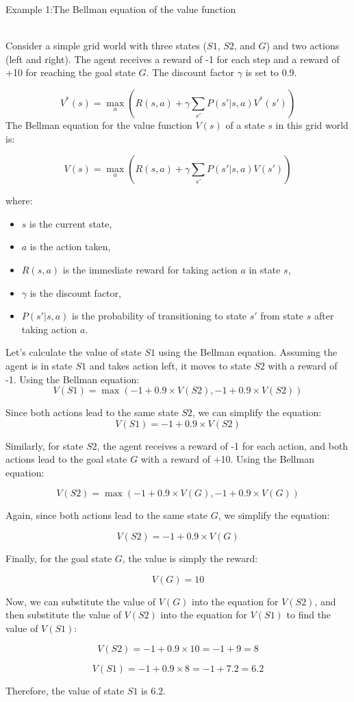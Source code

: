 \documentclass{article}
\begin{document}
\begin{Large}
Example 1:The Bellman equation of the value function
\end{Large}
\\
Consider a simple grid world with three states ($S1$, $S2$, and $G$) and two actions (left and right). The agent receives a reward of -1 for each step and a reward of +10 for reaching the goal state $G$. The discount factor $\gamma$ is set to 0.9.

\[
V^*(s) = \max_{a} \left( R(s, a) + \gamma \sum_{s'} P(s' | s, a) V^*(s') \right)
\]
The Bellman equation for the value function $V(s)$ of a state $s$ in this grid world is:

\[
V(s) = \max_a \left( R(s, a) + \gamma \sum_{s'} P(s' | s, a) V(s') \right)
\]

where:
\begin{itemize}
    \item $s$ is the current state,
    \item $a$ is the action taken,
    \item $R(s, a)$ is the immediate reward for taking action $a$ in state $s$,
    \item $\gamma$ is the discount factor,
    \item $P(s' | s, a)$ is the probability of transitioning to state $s'$ from state $s$ after taking action $a$.
\end{itemize}
Let's calculate the value of state $S1$ using the Bellman equation. Assuming the agent is in state $S1$ and takes action left, it moves to state $S2$ with a reward of -1. Using the Bellman equation:
\[
V(S1) = \max \left( -1 + 0.9 \times V(S2), -1 + 0.9 \times V(S2) \right)
\]

Since both actions lead to the same state $S2$, we can simplify the equation:
\[
V(S1) = -1 + 0.9 \times V(S2)
\]

Similarly, for state $S2$, the agent receives a reward of -1 for each action, and both actions lead to the goal state $G$ with a reward of +10. Using the Bellman equation:

\[
V(S2) = \max \left( -1 + 0.9 \times V(G), -1 + 0.9 \times V(G) \right)
\]

Again, since both actions lead to the same state $G$, we simplify the equation:

\[
V(S2) = -1 + 0.9 \times V(G)
\]

Finally, for the goal state $G$, the value is simply the reward:

\[
V(G) = 10
\]

Now, we can substitute the value of $V(G)$ into the equation for $V(S2)$, and then substitute the value of $V(S2)$ into the equation for $V(S1)$ to find the value of $V(S1)$:

\[
V(S2) = -1 + 0.9 \times 10 = -1 + 9 = 8
\]

\[
V(S1) = -1 + 0.9 \times 8 = -1 + 7.2 = 6.2
\]

Therefore, the value of state $S1$ is $6.2$.
\end{document}
